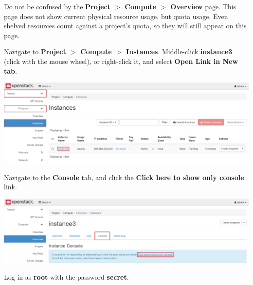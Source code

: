 \documentclass[letterpaper, 12pt]{article}
\begin{document}
\begin{enumerate}
    \begin{tipbox}
        Do not be confused by the \textbf{Project $>$ Compute $>$ Overview} page.
        This page does not show current physical resource usage, but quota usage.
        Even shelved resources count against a project's quota, so they will still appear on this page.
    \end{tipbox}

    \begin{labstep}
        Navigate to \textbf{Project $>$ Compute $>$ Instances}.
        Middle-click \textbf{instance3} (click with the mouse wheel), or right-click it, and select \textbf{Open Link in New tab}.

        \begin{center}
            \includegraphics[width=\linewidth]{images/part7/step3.png}
        \end{center}
    \end{labstep}

    \begin{labstep}
        Navigate to the \textbf{Console} tab, and click the \textbf{Click here to show only console} link.

        \begin{center}
            \includegraphics[width=\linewidth]{images/part7/step4.png}
        \end{center}
    \end{labstep}

    \begin{labstep}
        Log in as \textbf{root} with the password \textbf{secret}.


\end{labstep}
\end{enumerate}
\end{document}
